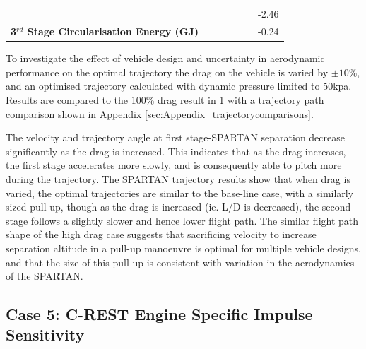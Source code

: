 \begin{table}[ht!]
\begin{tabular}{l c c c c c c}
		& \thirdcircmCdNinetyNoReturn
		& \thirdcircmCdNinetyFiveNoReturn
		& \thirdcircmCdStandardNoReturn
		& \thirdcircmCdOneHundredFiveNoReturn
		& \thirdcircmCdOneHundredTenNoReturn
		&-2.46
		\\
		\textbf{3$^{rd}$ Stage Circularisation Energy (GJ)}
		& \thirdcircEnergyCdNinetyNoReturn
		& \thirdcircEnergyCdNinetyFiveNoReturn
		& \thirdcircEnergyCdStandardNoReturn
		& \thirdcircEnergyCdOneHundredFiveNoReturn
		& \thirdcircEnergyCdOneHundredTenNoReturn
		&-0.24
		\\
		\hline 
	\end{tabular} 
	\caption{}
	\label{tab:DragVariationNoReturn}
\end{table}

To investigate the effect of vehicle design and uncertainty in aerodynamic performance on the optimal trajectory the drag on the vehicle is varied by $\pm10$\%, and an optimised trajectory calculated with dynamic pressure limited to 50kpa. Results are compared to the 100\% drag result in \ref{tab:DragVariationNoReturn} with a trajectory path comparison shown in Appendix \ref{sec:Appendix_trajectorycomparisons}. 

The velocity and trajectory angle at first stage-SPARTAN separation decrease significantly as the drag is increased. This indicates that as the drag increases, the first stage accelerates more slowly, and is consequently able to pitch more during the trajectory.
The SPARTAN trajectory results show that when drag is varied, the optimal trajectories are similar to the base-line case, with a similarly sized pull-up, though as the drag is increased (ie. L/D is decreased), the second stage follows a slightly slower and hence lower flight path. The similar flight path shape of the high drag case suggests that sacrificing velocity to increase separation altitude in a pull-up manoeuvre is optimal for multiple vehicle designs, and that the size of this pull-up is consistent with variation in the aerodynamics of the SPARTAN.



\subsection{Case 5: C-REST Engine Specific Impulse Sensitivity}

